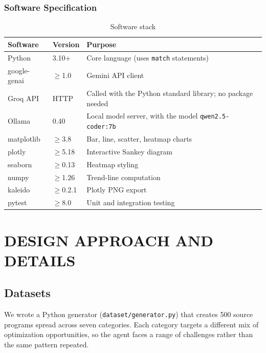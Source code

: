 \documentclass[12pt,a4paper]{report}
\begin{document}
\subsection{Software Specification}

\begin{table}[H]
\centering
\caption{Software stack}
\label{tab:software}
\begin{tabularx}{\textwidth}{|l|l|X|}
\hline
\textbf{Software} & \textbf{Version} & \textbf{Purpose} \\
\hline
Python & 3.10+ & Core language (uses \texttt{match} statements) \\
\hline
google-genai & $\geq$1.0 & Gemini API client \\
\hline
Groq API & HTTP & Called with the Python standard library; no package needed \\
\hline
Ollama & 0.40 & Local model server, with the model \texttt{qwen2.5-coder:7b} \\
\hline
matplotlib & $\geq$3.8 & Bar, line, scatter, heatmap charts \\
\hline
plotly & $\geq$5.18 & Interactive Sankey diagram \\
\hline
seaborn & $\geq$0.13 & Heatmap styling \\
\hline
numpy & $\geq$1.26 & Trend-line computation \\
\hline
kaleido & $\geq$0.2.1 & Plotly PNG export \\
\hline
pytest & $\geq$8.0 & Unit and integration testing \\
\hline
\end{tabularx}
\end{table}


\chapter{DESIGN APPROACH AND DETAILS}

\section{Datasets}

We wrote a Python generator (\texttt{dataset/generator.py}) that creates 500 source programs spread across seven categories. Each category targets a different mix of optimization opportunities, so the agent faces a range of challenges rather than the same pattern repeated.
\end{document}
